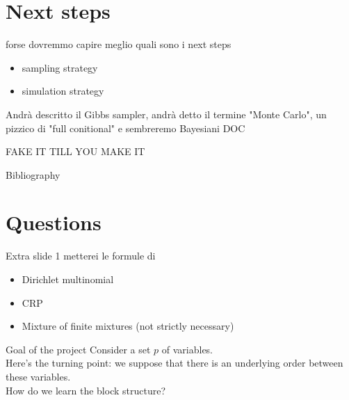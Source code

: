 \section{Next steps}
\begin{frame}

forse dovremmo capire meglio quali sono i next steps

\begin{itemize}
    \item sampling strategy
    \item simulation strategy
\end{itemize}


Andrà descritto il Gibbs sampler, andrà detto il termine "Monte Carlo", un pizzico di "full conitional" e sembreremo Bayesiani DOC

\centering \Huge FAKE IT TILL YOU MAKE IT
\end{frame}




\begin{frame}{Bibliography}
    \nocite{bensonAdaptiveMCMCMultiple2018}
    \nocite{martinezNonparametricChangePoint2014}
    \renewcommand*{\bibfont}{\tiny}
    \printbibliography
\end{frame}

\section*{Questions}


\begin{frame}{Extra slide 1}
metterei le formule di 
\begin{itemize}
    \item Dirichlet multinomial
    \item CRP
    \item Mixture of finite mixtures (not strictly necessary)

    

\end{itemize} 
\end{frame}




\begin{frame}
    {Goal of the project}
    Consider a set $p$ of variables.\\
    Here's the turning point: we suppose that there is an underlying order between these variables.\\
    How do we learn the block structure?
\end{frame}

